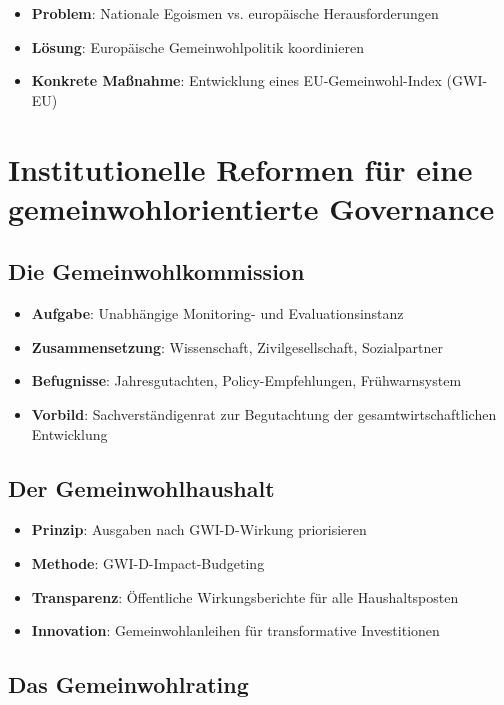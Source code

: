 \begin{itemize}
    \item \textbf{Problem}: Nationale Egoismen vs. europäische Herausforderungen
    \item \textbf{Lösung}: Europäische Gemeinwohlpolitik koordinieren
    \item \textbf{Konkrete Maßnahme}: Entwicklung eines EU-Gemeinwohl-Index (GWI-EU)
\end{itemize}

\section{Institutionelle Reformen für eine gemeinwohlorientierte Governance}

\subsection{Die Gemeinwohlkommission}

\begin{itemize}
    \item \textbf{Aufgabe}: Unabhängige Monitoring- und Evaluationsinstanz
    \item \textbf{Zusammensetzung}: Wissenschaft, Zivilgesellschaft, Sozialpartner
    \item \textbf{Befugnisse}: Jahresgutachten, Policy-Empfehlungen, Frühwarnsystem
    \item \textbf{Vorbild}: Sachverständigenrat zur Begutachtung der gesamtwirtschaftlichen Entwicklung
\end{itemize}

\subsection{Der Gemeinwohlhaushalt}

\begin{itemize}
    \item \textbf{Prinzip}: Ausgaben nach GWI-D-Wirkung priorisieren
    \item \textbf{Methode}: GWI-D-Impact-Budgeting
    \item \textbf{Transparenz}: Öffentliche Wirkungsberichte für alle Haushaltsposten
    \item \textbf{Innovation}: Gemeinwohlanleihen für transformative Investitionen
\end{itemize}

\subsection{Das Gemeinwohlrating}

